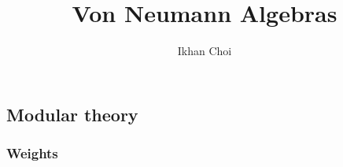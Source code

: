 \documentclass{../../large}
\begin{document}
\title{Von Neumann Algebras}
\author{Ikhan Choi}
\maketitle
\tableofcontents

\iffalse
injectivity
Connes embeddability
property Gamma
Connes' bicentralizer problem
Shlyakhtenko semicircular system
group stability
bimodule
noncommutative probability
\fi


\part{}




\chapter{Modular theory}



\section{Weights}
\end{document}
